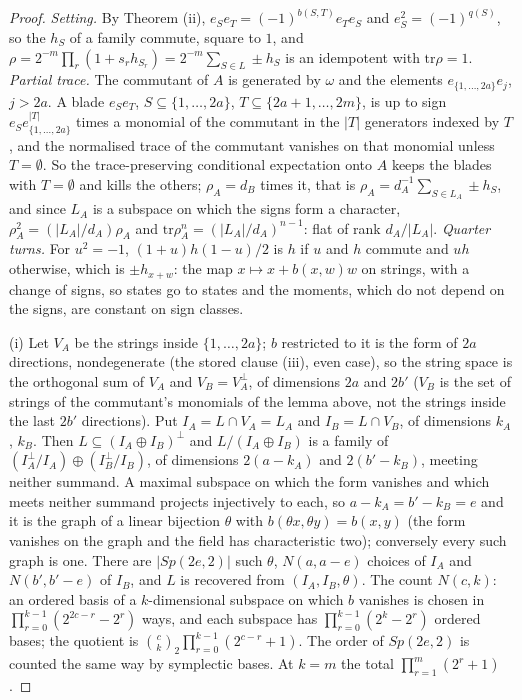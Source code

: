 \begin{proof}
\emph{Setting.} By Theorem (ii), $e_{S}e_{T} = (-1)^{b(S,T)}e_{T}e_{S}$ and $e_{S}^{2} = (-1)^{q(S)}$, so the $h_{S}$ of a family commute, square to $1$, and $\rho = 2^{-m}\prod_{r}(1 + s_{r}h_{S_{r}}) = 2^{-m}\sum_{S \in L}\pm h_{S}$ is an idempotent with $\mathrm{tr}\rho = 1$. \emph{Partial trace.} The commutant of $A$ is generated by $\omega$ and the elements $e_{\{1,\dots,2a\}}e_{j}$, $j > 2a$. A blade $e_{S}e_{T}$, $S \subseteq \{1,\dots,2a\}$, $T \subseteq \{2a+1,\dots,2m\}$, is up to sign $e_{S}e_{\{1,\dots,2a\}}^{|T|}$ times a monomial of the commutant in the $|T|$ generators indexed by $T$, and the normalised trace of the commutant vanishes on that monomial unless $T = \emptyset$. So the trace-preserving conditional expectation onto $A$ keeps the blades with $T = \emptyset$ and kills the others; $\rho_{A} = d_{B}$ times it, that is $\rho_{A} = d_{A}^{-1}\sum_{S \in L_{A}}\pm h_{S}$, and since $L_{A}$ is a subspace on which the signs form a character, $\rho_{A}^{2} = (|L_{A}|/d_{A})\rho_{A}$ and $\mathrm{tr}\rho_{A}^{n} = (|L_{A}|/d_{A})^{n-1}$: flat of rank $d_{A}/|L_{A}|$. \emph{Quarter turns.} For $u^{2} = -1$, $(1 + u)h(1 - u)/2$ is $h$ if $u$ and $h$ commute and $uh$ otherwise, which is $\pm h_{x + w}$: the map $x \mapsto x + b(x,w)w$ on strings, with a change of signs, so states go to states and the moments, which do not depend on the signs, are constant on sign classes.

(i) Let $V_{A}$ be the strings inside $\{1,\dots,2a\}$; $b$ restricted to it is the form of $2a$ directions, nondegenerate (the stored clause (iii), even case), so the string space is the orthogonal sum of $V_{A}$ and $V_{B} = V_{A}^{\perp}$, of dimensions $2a$ and $2b'$ ($V_{B}$ is the set of strings of the commutant's monomials of the lemma above, not the strings inside the last $2b'$ directions). Put $I_{A} = L \cap V_{A} = L_{A}$ and $I_{B} = L \cap V_{B}$, of dimensions $k_{A}$, $k_{B}$. Then $L \subseteq (I_{A} \oplus I_{B})^{\perp}$ and $L/(I_{A} \oplus I_{B})$ is a family of $(I_{A}^{\perp}/I_{A}) \oplus (I_{B}^{\perp}/I_{B})$, of dimensions $2(a - k_{A})$ and $2(b' - k_{B})$, meeting neither summand. A maximal subspace on which the form vanishes and which meets neither summand projects injectively to each, so $a - k_{A} = b' - k_{B} = e$ and it is the graph of a linear bijection $\theta$ with $b(\theta x, \theta y) = b(x, y)$ (the form vanishes on the graph and the field has characteristic two); conversely every such graph is one. There are $|Sp(2e, 2)|$ such $\theta$, $N(a, a - e)$ choices of $I_{A}$ and $N(b', b' - e)$ of $I_{B}$, and $L$ is recovered from $(I_{A}, I_{B}, \theta)$. The count $N(c, k)$: an ordered basis of a $k$-dimensional subspace on which $b$ vanishes is chosen in $\prod_{r=0}^{k-1}(2^{2c - r} - 2^{r})$ ways, and each subspace has $\prod_{r=0}^{k-1}(2^{k} - 2^{r})$ ordered bases; the quotient is $\binom{c}{k}_{2}\prod_{r=0}^{k-1}(2^{c-r} + 1)$. The order of $Sp(2e, 2)$ is counted the same way by symplectic bases. At $k = m$ the total $\prod_{r=1}^{m}(2^{r} + 1)$.


\end{proof}
